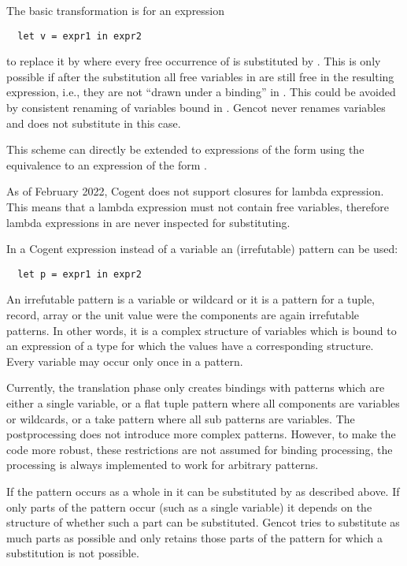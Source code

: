The basic transformation is for an expression
\begin{verbatim}
  let v = expr1 in expr2
\end{verbatim}
to replace it by  where every free occurrence of  is substituted by . This is only 
possible if after the substitution all free variables in  are still free in the resulting expression, i.e., 
they are not ``drawn under a binding'' in . This could be avoided by consistent renaming of variables bound in 
. Gencot never renames variables and does not substitute in this case.

This scheme can directly be extended to expressions of the form  using the
equivalence to an expression of the form .

As of February 2022, Cogent does not support closures for lambda expression. This means that a lambda expression must not
contain free variables, therefore lambda expressions in  are never inspected for substituting.

In a Cogent  expression instead of a variable  an (irrefutable) pattern  can be used:
\begin{verbatim}
  let p = expr1 in expr2
\end{verbatim}
An irrefutable pattern
is a variable or wildcard or it is a pattern for a tuple, record, array or the unit value were the components are again
irrefutable patterns. In other words, it is a complex structure of variables which is bound to an expression 
of a type for which the values have a corresponding structure. Every variable may occur only once in a pattern.

Currently, the translation phase only creates bindings with patterns which are either a single variable, or a flat tuple pattern where
all components are variables or wildcards, or a take pattern where all sub patterns are variables. The postprocessing does not 
introduce more complex patterns. However, to make the code more robust, these restrictions are not assumed for binding processing,
the processing is always implemented to work for arbitrary patterns.

If the pattern occurs as a whole in  it can be
substituted by  as described above. If only parts of the pattern occur (such as a single variable) it depends
on the structure of  whether such a part can be substituted. Gencot tries to substitute as much parts as possible 
and only retains those parts of the pattern for which a substitution is not possible.

